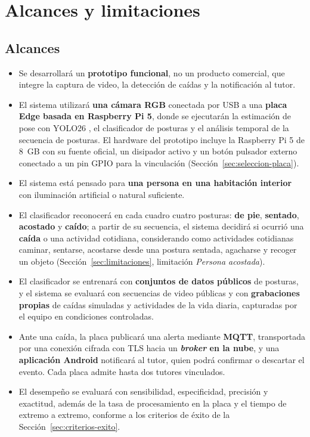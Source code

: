 \documentclass[12pt,a4paper,oneside]{book}
\theoremstyle{plain}
\theoremstyle{definition}
\theoremstyle{remark}
\begin{document}
\section{Alcances y limitaciones}
\label{sec:alcances}
 
\subsection{Alcances}
\begin{itemize}
  \item Se desarrollará un \textbf{prototipo funcional}, no un producto comercial, que integre la captura de video, la detección de caídas y la notificación al tutor.
  \item El sistema utilizará \textbf{una cámara RGB} conectada por USB a una \textbf{placa Edge basada en Raspberry Pi 5}, donde se ejecutarán la estimación de pose con YOLO26 \parencite{ultralytics2026yolo26}, el clasificador de posturas y el análisis temporal de la secuencia de posturas. El hardware del prototipo incluye la Raspberry Pi 5 de 8~GB con su fuente oficial, un disipador activo y un botón pulsador externo conectado a un pin GPIO para la vinculación (Sección~\ref{sec:seleccion-placa}).
  \item El sistema está pensado para \textbf{una persona en una habitación interior} con iluminación artificial o natural suficiente.
  \item El clasificador reconocerá en cada cuadro cuatro posturas: \textbf{de pie}, \textbf{sentado}, \textbf{acostado} y \textbf{caído}; a partir de su secuencia, el sistema decidirá si ocurrió una \textbf{caída} o una actividad cotidiana, considerando como actividades cotidianas caminar, sentarse, acostarse desde una postura sentada, agacharse y recoger un objeto (Sección~\ref{sec:limitaciones}, limitación \textit{Persona acostada}).
  \item El clasificador se entrenará con \textbf{conjuntos de datos públicos} de posturas, y el sistema se evaluará con secuencias de video públicas y con \textbf{grabaciones propias} de caídas simuladas y actividades de la vida diaria, capturadas por el equipo en condiciones controladas.
  \item Ante una caída, la placa publicará una alerta mediante \textbf{MQTT}, transportada por una conexión cifrada con TLS hacia un \textbf{\textit{broker} en la nube}, y una \textbf{aplicación Android} notificará al tutor, quien podrá confirmar o descartar el evento. Cada placa admite hasta dos tutores vinculados.
  \item El desempeño se evaluará con sensibilidad, especificidad, precisión y exactitud, además de la tasa de procesamiento en la placa y el tiempo de extremo a extremo, conforme a los criterios de éxito de la Sección~\ref{sec:criterios-exito}.
\end{itemize}
 
\end{document}
